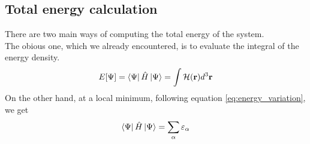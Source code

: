 \subsection{Total energy calculation}
There are two main ways of computing the total energy of the system.
\\The obious one, which we already encountered, is to evaluate the integral of the energy density.
\begin{equation*}
    E[\Psi] = \bra{\Psi} \hat{H} \ket{\Psi} = \int \mathcal H (\mathbf r) d^3\mathbf r
\end{equation*}
On the other hand, at a local minimum, following equation \ref{eq:energy_variation}, we get
\begin{equation}
    \bra{\Psi} \hat{H} \ket{\Psi} = \sum_{\alpha} \varepsilon_\alpha
\end{equation}